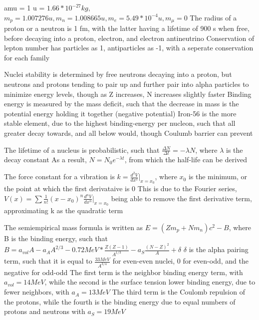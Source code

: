 \documentclass[11 pt, twoside]{article}
\newenvironment{outline*}
{
	\begin{outline}[enumerate]
	}
	{\end{outline}
}
\begin{document}
\begin{outline*}
 amu = 1 u = $1.66 * 10^{-27} kg$, $m_p = 1.007276 u, m_n = 1.008665 u, m_e = 5.49 * 10^{-4} u, m_{\mu} = 0$
	\2 The radius of a proton or a neutron is 1 fm, with the latter having a lifetime of 900 s when free, before decaying into a proton, electron, and electron antineutrino
	\2 Conservation of lepton number has particles as 1, antiparticles as -1, with a seperate conservation for each family

\1 Nuclei stability is determined by free neutrons decaying into a proton, but neutrons and protons tending to pair up and further pair into alpha particles to minimize energy levels, though as Z increases, N increases slightly faster
	\2 Binding energy is measured by the mass deficit, such that the decrease in mass is the potential energy holding it together (negative potential)
	\2 Iron-56 is the more stable element, due to the highest binding-energy per nucleon, such that all greater decay towards, and all below would, though Coulumb barrier can prevent

\1 The lifetime of a nucleus is probabilistic, such that $\frac{\Delta N}{\Delta t} = -\lambda N$, where $\lambda$ is the decay constant
	\2 As a result, $N = N_0e^{-\lambda t}$, from which the half-life can be derived

\1 The force constant for a vibration is $k = \frac{d^2 V}{dx^2}|_{x = x_0}$, where $x_0$ is the minimum, or the point at which the first derivataive is 0
	\2 This is due to the Fourier series, $V(x) = \sum \frac{1}{n!}(x - x_0)^n \frac{d^nV}{dx^n}|_{x = x_0}$ being able to remove the first derivative term, approximating k as the quadratic term

\1 The semiempirical mass formula is written as $E = (Zm_p + Nm_n)c^2 - B$, where B is the binding energy, such that $B = a_{vol}A - a_AA^{2/3} - 0.72 MeV * \frac{Z(Z - 1)}{A^{1/3}} - a_S\frac{(N - Z)^2}{A} + \delta$
	\2 $\delta$ is the alpha pairing term, such that it is equal to $\frac{33 MeV}{A^{3/4}}$ for even-even nuclei, 0 for even-odd, and the negative for odd-odd
	\2 The first term is the neighbor binding energy term, with $a_{vol} = 14 MeV$, while the second is the surface tension lower binding energy, due to fewer neighbors, with $a_A = 13 MeV$
	\2 The third term is the Coulomb repulsion of the protons, while the fourth is the binding energy due to equal numbers of protons and neutrons with $a_S = 19 MeV$


\end{outline*}
\end{document}
